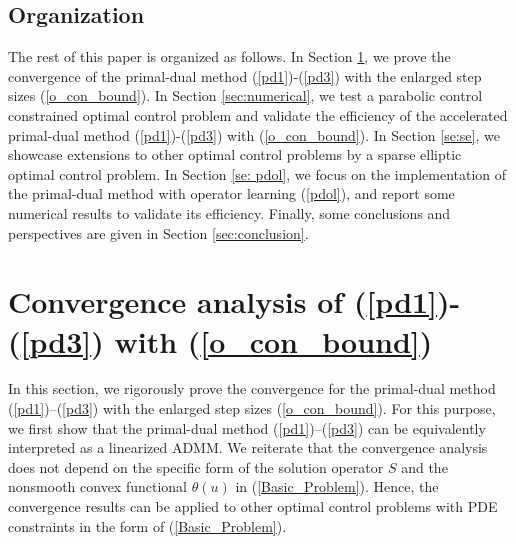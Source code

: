 \documentclass[final]{siamart171218}
\theoremstyle{remark}
\begin{document}


\subsection{Organization}
The rest of this paper is organized as follows. In Section \ref{sec:convergence_primal_dual}, we prove the convergence of the primal-dual method (\ref{pd1})-(\ref{pd3}) with the enlarged step sizes (\ref{o_con_bound}). In Section \ref{sec:numerical}, we test a parabolic control constrained optimal control problem and validate the efficiency of the accelerated primal-dual method (\ref{pd1})-(\ref{pd3}) with (\ref{o_con_bound}). In Section \ref{se:se}, we showcase extensions to other optimal control problems by a sparse elliptic optimal control problem. In Section \ref{se: pdol}, we focus on the implementation of the primal-dual method with operator learning (\ref{pdol}), and report some numerical results to validate its efficiency. Finally, some conclusions and perspectives are given in Section \ref{sec:conclusion}.



\section{Convergence analysis of (\ref{pd1})-(\ref{pd3}) with (\ref{o_con_bound})}\label{sec:convergence_primal_dual}

In this section, we rigorously prove the convergence for the primal-dual method (\ref{pd1})--(\ref{pd3}) with the enlarged step sizes (\ref{o_con_bound}). For this purpose, we first show that the primal-dual method (\ref{pd1})--(\ref{pd3}) can be equivalently interpreted as a linearized ADMM. We reiterate that the convergence analysis does not depend on the specific form of the solution operator $S$ and the nonsmooth convex functional $\theta(u)$ in (\ref{Basic_Problem}). Hence, the convergence results can be applied to other optimal control problems with PDE constraints in the form of (\ref{Basic_Problem}).
\end{document}
